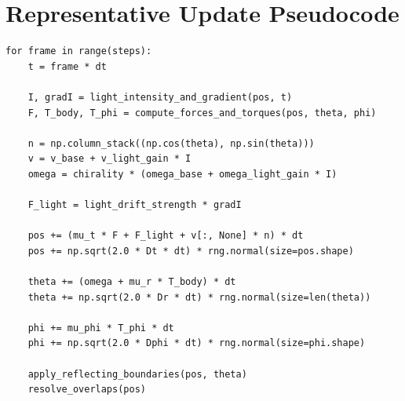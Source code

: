 \documentclass[12pt,a4paper,oneside]{report}
\begin{document}
\section{Representative Update Pseudocode}
\begin{lstlisting}[style=pythonstyle,caption={Simplified pseudocode representing the update logic used in the simulation.}]
for frame in range(steps):
    t = frame * dt

    I, gradI = light_intensity_and_gradient(pos, t)
    F, T_body, T_phi = compute_forces_and_torques(pos, theta, phi)

    n = np.column_stack((np.cos(theta), np.sin(theta)))
    v = v_base + v_light_gain * I
    omega = chirality * (omega_base + omega_light_gain * I)

    F_light = light_drift_strength * gradI

    pos += (mu_t * F + F_light + v[:, None] * n) * dt
    pos += np.sqrt(2.0 * Dt * dt) * rng.normal(size=pos.shape)

    theta += (omega + mu_r * T_body) * dt
    theta += np.sqrt(2.0 * Dr * dt) * rng.normal(size=len(theta))

    phi += mu_phi * T_phi * dt
    phi += np.sqrt(2.0 * Dphi * dt) * rng.normal(size=phi.shape)

    apply_reflecting_boundaries(pos, theta)
    resolve_overlaps(pos)
\end{lstlisting}
\end{document}
